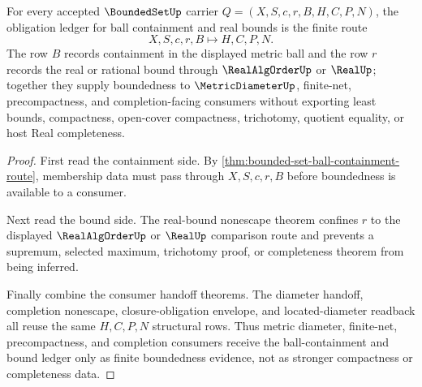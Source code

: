 \begin{theorem}
\label{thm:boundedset-obligation-ledger}
For every accepted $\BoundedSetUp$ carrier $Q=(X,S,c,r,B,H,C,P,N)$, the obligation ledger for ball containment and real bounds is the finite route
$$
X,S,c,r,B \longmapsto H,C,P,N .
$$
The row $B$ records containment in the displayed metric ball and the row $r$ records the real or rational bound through $\RealAlgOrderUp$ or $\RealUp$; together they supply boundedness to $\MetricDiameterUp$, finite-net, precompactness, and completion-facing consumers without exporting least bounds, compactness, open-cover compactness, trichotomy, quotient equality, or host Real completeness.
\end{theorem}
\begin{proof}
First read the containment side. By \autoref{thm:bounded-set-ball-containment-route}, membership data must pass through $X,S,c,r,B$ before boundedness is available to a consumer.

Next read the bound side. The real-bound nonescape theorem confines $r$ to the displayed $\RealAlgOrderUp$ or $\RealUp$ comparison route and prevents a supremum, selected maximum, trichotomy proof, or completeness theorem from being inferred.

Finally combine the consumer handoff theorems. The diameter handoff, completion nonescape, closure-obligation envelope, and located-diameter readback all reuse the same $H,C,P,N$ structural rows. Thus metric diameter, finite-net, precompactness, and completion consumers receive the ball-containment and bound ledger only as finite boundedness evidence, not as stronger compactness or completeness data.
\end{proof}

